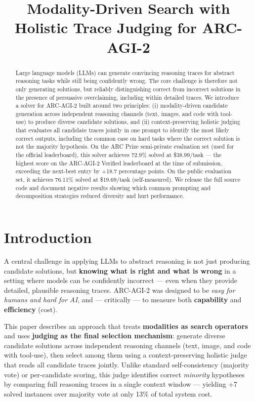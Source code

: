 \documentclass[10pt]{article}
\title{Modality-Driven Search with Holistic Trace Judging for ARC-AGI-2}
\begin{document}
\maketitle

\begin{abstract}
Large language models (LLMs) can generate convincing reasoning traces
for abstract reasoning tasks while still being confidently wrong. The
core challenge is therefore not only generating solutions, but reliably
distinguishing correct from incorrect solutions in the presence of
persuasive overclaiming, including within detailed traces. We introduce
a solver for ARC-AGI-2 built around two principles: (i) modality-driven
candidate generation across independent reasoning channels (text,
images, and code with tool-use) to produce diverse candidate solutions,
and (ii) context-preserving holistic judging that evaluates all
candidate traces jointly in one prompt to identify the most likely
correct outputs, including the common case on hard tasks where the
correct solution is not the majority hypothesis. On the ARC Prize
semi-private evaluation set (used for the official leaderboard), this
solver achieves 72.9\% solved at \$38.99/task --- the highest score on
the ARC-AGI-2 Verified leaderboard at the time of submission, exceeding
the next-best entry by +18.7 percentage points. On the public evaluation
set, it achieves 76.11\% solved at \$19.69/task (self-measured). We
release the full source code and document negative results showing which
common prompting and decomposition strategies reduced diversity and hurt
performance.
\end{abstract}

\hypertarget{introduction}{%
\section{Introduction}\label{introduction}}

A central challenge in applying LLMs to abstract reasoning is not just
producing candidate solutions, but \textbf{knowing what is right and
what is wrong} in a setting where models can be confidently incorrect
--- even when they provide detailed, plausible reasoning traces.
ARC-AGI-2 \citep{arcprize2024report} was designed to be \emph{easy for
humans and hard for AI}, and --- critically --- to measure both
\textbf{capability} and \textbf{efficiency} (cost).

This paper describes an approach that treats \textbf{modalities as
search operators} and uses \textbf{judging as the final selection
mechanism}: generate diverse candidate solutions across independent
reasoning channels (text, image, and code with tool-use), then select
among them using a context-preserving holistic judge that reads all
candidate traces jointly. Unlike standard self-consistency (majority
vote) or per-candidate scoring, this judge identifies correct
\emph{minority} hypotheses by comparing full reasoning traces in a
single context window --- yielding +7 solved instances over majority
vote at only 13\% of total system cost.
\end{document}
